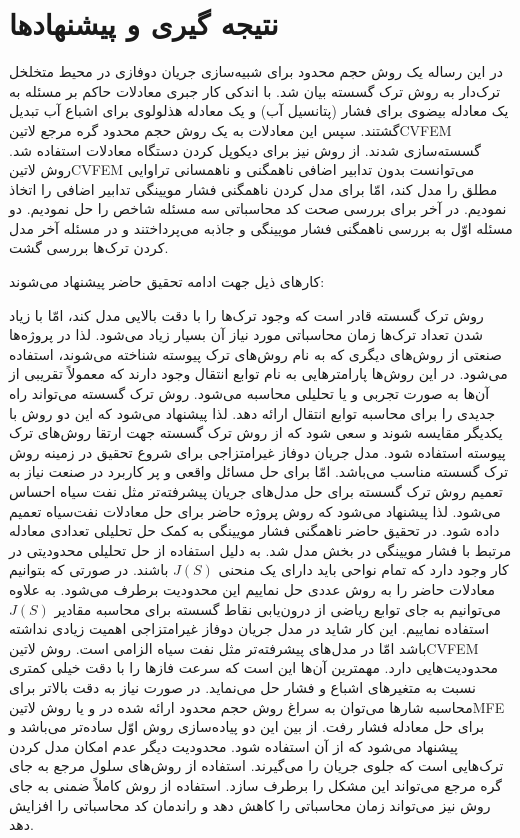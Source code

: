 \chapter{نتیجه گیری و پیشنهادها} 
\label{ch:fasl5}
در این رساله یک روش حجم محدود برای شبیه‌سازی جریان دوفازی در محیط متخلخل ترک‌دار به روش ترک گسسته بیان شد. با اندکی کار جبری معادلات حاکم بر مسئله به یک معادله بیضوی برای فشار (پتانسیل آب) و یک معادله هذلولوی برای اشباع آب تبدیل گشتند. سپس این معادلات به یک روش حجم محدود گره مرجع ‌لاتین{CVFEM} گسسته‌سازی شدند. از روش  نیز برای دیکوپل کردن دستگاه معادلات استفاده شد. روش ‌لاتین{CVFEM} می‌توانست بدون تدابیر اضافی ناهمگنی و ناهمسانی تراوایی مطلق را مدل کند، امّا برای مدل کردن ناهمگنی فشار مویینگی تدابیر اضافی را اتخاذ نمودیم. در آخر برای بررسی صحت کد محاسباتی سه مسئله شاخص را حل نمودیم. دو مسئله اوّل به بررسی ناهمگنی فشار مویینگی و جاذبه می‌پرداختند و در مسئله آخر مدل کردن ترک‌ها بررسی گشت. 

کارهای ذیل جهت ادامه تحقیق حاضر پیشنهاد می‌شوند:
\begin{tight_itemize}
 روش ترک گسسته قادر است که وجود ترک‌ها را با دقت بالایی مدل کند، امّا با زیاد شدن تعداد ترک‌ها زمان محاسباتی مورد نیاز آن بسیار زیاد می‌شود. لذا در پروژه‌ها صنعتی از روش‌های دیگری که به نام روش‌های ترک پیوسته شناخته می‌شوند، استفاده می‌شود. در این روش‌ها پارامترهایی به نام توابع انتقال وجود دارند که معمولاً تقریبی از آن‌ها به صورت تجربی و یا تحلیلی محاسبه می‌شود. روش ترک گسسته می‌تواند راه جدیدی را برای محاسبه توابع انتقال ارائه دهد. لذا پیشنهاد می‌شود که این دو روش با یکدیگر مقایسه شوند و سعی شود که از روش ترک گسسته جهت ارتقا روش‌های ترک پیوسته استفاده شود.
 مدل جریان دوفاز غیرامتزاجی برای شروع تحقیق در زمینه روش ترک گسسته مناسب می‌باشد. امّا برای حل مسائل واقعی  و پر کاربرد در صنعت نیاز به تعمیم روش ترک گسسته برای حل مدل‌های جریان پیشرفته‌تر مثل نفت سیاه احساس می‌شود. لذا پیشنهاد می‌شود که روش پروژه حاضر برای حل معادلات نفت‌سیاه تعمیم داده شود.
 در تحقیق حاضر ناهمگنی فشار مویینگی به کمک حل تحلیلی تعدادی معادله مرتبط با فشار مویینگی در بخش  مدل شد. به دلیل استفاده از حل تحلیلی محدودیتی در کار وجود دارد که تمام نواحی باید دارای یک منحنی $J(S)$ باشند. در صورتی که بتوانیم معادلات حاضر را به روش عددی حل نماییم این محدودیت برطرف می‌شود. به علاوه می‌توانیم به جای توابع ریاضی از درون‌یابی نقاط گسسته برای محاسبه مقادیر $J(S)$ استفاده نماییم. این کار شاید در مدل جریان دوفاز غیرامتزاجی اهمیت زیادی نداشته باشد امّا در مدل‌های پیشرفته‌تر مثل نفت سیاه الزامی است.
 روش ‌لاتین{CVFEM} محدودیت‌هایی دارد. مهمترین آن‌ها این است که سرعت فاز‌ها را با دقت خیلی کمتری نسبت به متغیر‌های اشباع و فشار حل می‌نماید. در صورت نیاز به دقت بالاتر برای محاسبه شار‌ها می‌توان به سراغ روش حجم محدود ارائه شده در  و یا روش  ‌لاتین{MFE} برای حل معادله فشار رفت. از بین این دو پیاده‌سازی روش اوّل ساده‌تر می‌باشد و پیشنهاد می‌شود که از آن استفاده شود. محدودیت دیگر عدم امکان مدل کردن ترک‌هایی است که جلوی جریان را می‌گیرند. استفاده از روش‌های سلول مرجع به جای گره مرجع می‌تواند این مشکل را برطرف سازد.
 استفاده از روش کاملاً ضمنی به جای روش  نیز می‌تواند زمان محاسباتی را کاهش دهد و راندمان کد محاسباتی را افزایش دهد.
\end{tight_itemize}
